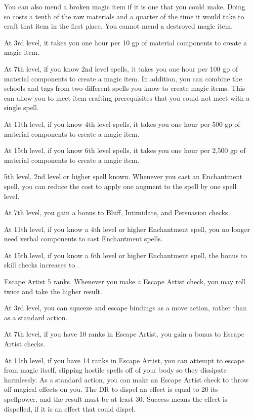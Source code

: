     You can also mend a broken magic item if it is one that you could make.
    Doing so costs a tenth of the raw materials and a quarter of the time it would take to craft that item in the first place.
    You cannot mend a destroyed magic item.

    At 3rd level, it takes you one hour per 10 gp of material components to create a magic item. %

    At 7th level, if you know 2nd level spells, it takes you one hour per 100 gp of material components to create a magic item. %
    In addition, you can combine the schools and tags from two different spells you know to create magic items.
    This can allow you to meet item crafting prerequisites that you could not meet with a single spell.

    At 11th level, if you know 4th level spells, it takes you one hour per 500 gp of material components to create a magic item. %

    At 15th level, if you know 6th level spells, it takes you one hour per 2,500 gp of material components to create a magic item. %

    \featpres 5th level, 2nd level or higher  spell known.
    \featben Whenever you cast an Enchantment spell, you can reduce the cost to apply one augment to the spell by one spell level.

    At 7th level, you gain a  bonus to Bluff, Intimidate, and Persuasion checks.

    At 11th level, if you know a 4th level or higher Enchantment spell, you no longer need verbal components to cast Enchantment spells.

    At 15th level, if you know a 6th level or higher Enchantment spell, the bonus to skill checks increases to .

    \featpre Escape Artist 5 ranks.
    \featben Whenever you make a Escape Artist check, you may roll twice and take the higher result.

    At 3rd level, you can squeeze and escape bindings as a move action, rather than as a standard action.

    At 7th level, if you have 10 ranks in Escape Artist, you gain a  bonus to Escape Artist checks.

    At 11th level, if you have 14 ranks in Escape Artist, you can attempt to escape from magic itself, slipping hostile spells off of your body so they dissipate harmlessly.
    As a standard action, you can make an Escape Artist check to throw off magical effects on you.
    The DR to dispel an effect is equal to 20 \add its spellpower, and the result must be at least 30.
    Success means the effect is dispelled, if it is an effect that  could dispel.

